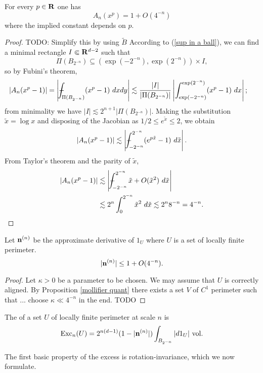 \begin{lemma}\label{average of xp is harmless}
For every $p \in \mathbf{R}$ one has 
$$A_n(x^p) = 1 + O(4^{-n})$$
where the implied constant depends on $p$.
\end{lemma}
\begin{proof}
TODO: Simplify this by using $\tilde B$
According to (\ref{sup in a ball}), we can find a minimal rectangle $I \Subset \mathbf{R}^{d - 2}$ such that
$$\Pi(B_{2^{-n}}) \subseteq (\exp(-2^{-n}), \exp(2^{-n})) \times I,$$
so by Fubini's theorem,
\begin{align*}|A_n(x^p - 1)| &= \left|\dashint_{\Pi(B_{2^{-n}})} (x^p - 1) ~dxdy\right| \lesssim \frac{|I|}{|\Pi(B_{2^{-n}})|} \left|\int_{\exp(-2^{-n})}^{\exp(2^{-n})} (x^p - 1)~ dx\right|;
\end{align*}
from minimality we have $|I| \lesssim 2^{n + 1} |\Pi(B_{2^{-n}})|$.
Making the substitution $\tilde x = \log x$ and disposing of the Jacobian as $1/2 \leq e^{\tilde x} \leq 2$, we obtain 
$$|A_n(x^p - 1)| \lesssim \left|\dashint_{-2^{-n}}^{2^{-n}} (e^{p\tilde x} - 1) ~d\tilde x\right|.$$
From Taylor's theorem and the parity of $\tilde x$, 
\begin{align*}
|A_n(x^p - 1)| &\lesssim \left|\dashint_{-2^{-n}}^{2^{-n}} \tilde x + O(\tilde x^2) ~d\tilde x\right| \\
&\lesssim 2^n \int_0^{2^{-n}} \tilde x^2 ~d\tilde x \lesssim 2^n 8^{-n} = 4^{-n}. \qedhere 
\end{align*}
\end{proof}

\begin{lemma}\label{normal has length 1}
Let $\mathbf n^{(n)}$ be the approximate derivative of $1_U$ where $U$ is a set of locally finite perimeter.
$$|\mathbf n^{(n)}| \leq 1 + O(4^{-n}).$$
\end{lemma}
\begin{proof}
Let $\kappa > 0$ be a parameter to be chosen.
We may assume that $U$ is correctly aligned.
By Proposition \ref{mollifier quant} there exists a set $V$ of $C^1$ perimeter such that ... choose $\kappa \ll 4^{-n}$ in the end. TODO
\end{proof}

\begin{definition}
The  of a set $U$ of locally finite perimeter at scale $n$ is
$$\operatorname{Exc}_n(U) = 2^{n(d - 1)} (1 - |\mathbf n^{(n)}|) \int_{B_{2^{-n}}} |d1_U| ~\mathrm{vol}.$$
\end{definition}

The first basic property of the excess is rotation-invariance, which we now formulate.

